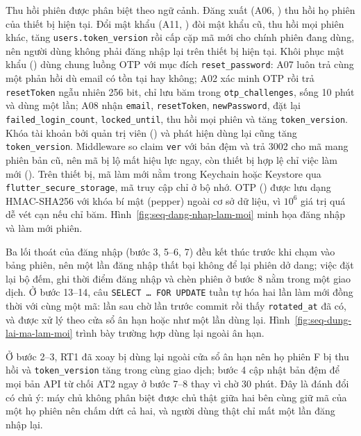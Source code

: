 Thu hồi phiên được phân biệt theo ngữ cảnh. Đăng xuất (A06, ) thu hồi họ phiên của thiết bị hiện tại. Đổi mật khẩu (A11, ) đòi mật khẩu cũ, thu hồi mọi phiên khác, tăng \texttt{users.token\_version} rồi cấp cặp mã mới cho chính phiên đang dùng, nên người dùng không phải đăng nhập lại trên thiết bị hiện tại. Khôi phục mật khẩu () dùng chung luồng OTP với mục đích \texttt{reset\_password}: A07 luôn trả cùng một phản hồi dù email có tồn tại hay không; A02 xác minh OTP rồi trả \texttt{resetToken} ngẫu nhiên 256 bit, chỉ lưu băm trong \texttt{otp\_challenges}, sống 10 phút và dùng một lần; A08 nhận \texttt{email}, \texttt{resetToken}, \texttt{newPassword}, đặt lại \texttt{failed\_login\_count}, \texttt{locked\_until}, thu hồi mọi phiên và tăng \texttt{token\_version}. Khóa tài khoản bởi quản trị viên () và phát hiện dùng lại cũng tăng \texttt{token\_version}. Middleware so claim \texttt{ver} với bản đệm  và trả 3002 cho mã mang phiên bản cũ, nên mã bị lộ mất hiệu lực ngay, còn thiết bị hợp lệ chỉ việc làm mới (). Trên thiết bị, mã làm mới nằm trong Keychain hoặc Keystore qua \texttt{flutter\_secure\_storage}, mã truy cập chỉ ở bộ nhớ. OTP () được lưu dạng HMAC-SHA256 với khóa bí mật (pepper) ngoài cơ sở dữ liệu, vì $10^6$ giá trị quá dễ vét cạn nếu chỉ băm. Hình~\ref{fig:seq-dang-nhap-lam-moi} minh họa đăng nhập và làm mới phiên.


Ba lối thoát của đăng nhập (bước 3, 5--6, 7) đều kết thúc trước khi chạm vào bảng phiên, nên một lần đăng nhập thất bại không để lại phiên dở dang; việc đặt lại bộ đếm, ghi thời điểm đăng nhập và chèn phiên ở bước 8 nằm trong một giao dịch. Ở bước 13--14, câu \texttt{SELECT \ldots{} FOR UPDATE} tuần tự hóa hai lần làm mới đồng thời với cùng một mã: lần sau chờ lần trước commit rồi thấy \texttt{rotated\_at} đã có, và được xử lý theo cửa sổ ân hạn hoặc như một lần dùng lại. Hình~\ref{fig:seq-dung-lai-ma-lam-moi} trình bày trường hợp dùng lại ngoài ân hạn.


Ở bước 2--3, RT1 đã xoay bị dùng lại ngoài cửa sổ ân hạn nên họ phiên F bị thu hồi và \texttt{token\_version} tăng trong cùng giao dịch; bước 4 cập nhật bản đệm để mọi bản API từ chối AT2 ngay ở bước 7--8 thay vì chờ 30 phút. Đây là đánh đổi có chủ ý: máy chủ không phân biệt được chủ thật giữa hai bên cùng giữ mã của một họ phiên nên chấm dứt cả hai, và người dùng thật chỉ mất một lần đăng nhập lại.

